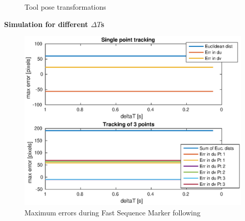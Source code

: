 \documentclass[]{scrartcl}
\begin{document}
\begin{figure}[!htp]
	\hfill
	\caption{Tool pose transformations}
	\label{fig:FastSequenceToolPose}
\end{figure}

\vspace{0.5cm}
\textbf{Simulation for different $\Delta T$s} \\
\begin{figure}
	\centering
	\includegraphics[width=0.7\linewidth]{fig/FastSequence_errors.eps}
	\caption{Maximum errors during Fast Sequence Marker following}
	\label{fig:FastSequence_errors}
\end{figure}
\end{document}
